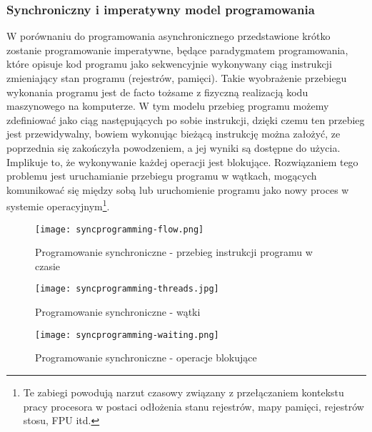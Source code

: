 \subsubsection{Synchroniczny i imperatywny model programowania}

W porównaniu do programowania asynchronicznego przedstawione krótko zostanie programowanie imperatywne, będące paradygmatem programowania\cite{programming-paradigms}, które opisuje kod programu jako sekwencyjnie wykonywany ciąg instrukcji zmieniający stan programu (rejestrów, pamięci). Takie wyobrażenie przebiegu wykonania programu jest de facto tożsame z fizyczną realizacją kodu maszynowego na komputerze. W tym modelu przebieg programu możemy zdefiniować jako ciąg następujących po sobie instrukcji, dzięki czemu ten przebieg jest przewidywalny, bowiem wykonując bieżącą instrukcję można założyć, ze poprzednia się zakończyła powodzeniem, a jej wyniki są dostępne do użycia. Implikuje to, że wykonywanie każdej operacji jest blokujące. Rozwiązaniem tego problemu jest uruchamianie przebiegu programu w wątkach, mogących komunikować się między sobą lub uruchomienie programu jako nowy proces w systemie operacyjnym\footnote{Te zabiegi powodują narzut czasowy związany z przełączaniem kontekstu pracy procesora w postaci odłożenia stanu rejestrów, mapy pamięci, rejestrów stosu, FPU itd.}.

\begin{figure}[ht]
\centering
\begin{minipage}[b]{0.45\linewidth}
  \label{fig:syncprogramming-flow}
  \centering
    \texttt{[image: syncprogramming-flow.png]}
  \caption[Programowanie synchroniczne - przebieg instrukcji programu w czasie]{Programowanie synchroniczne - przebieg instrukcji programu w czasie}
\end{minipage}

\begin{minipage}[b]{0.45\linewidth}
\label{fig:syncprogramming-threads}
  \centering
    \texttt{[image: syncprogramming-threads.jpg]}
  \caption[Programowanie synchroniczne - wątki]{Programowanie synchroniczne - wątki}
\end{minipage}

\begin{minipage}[b]{0.45\linewidth}
\label{fig:syncprogramming-waiting}
  \centering
    \texttt{[image: syncprogramming-waiting.png]}
  \caption[Programowanie synchroniczne - operacje blokujące]{Programowanie synchroniczne - operacje blokujące}
\end{minipage}
\end{figure}

